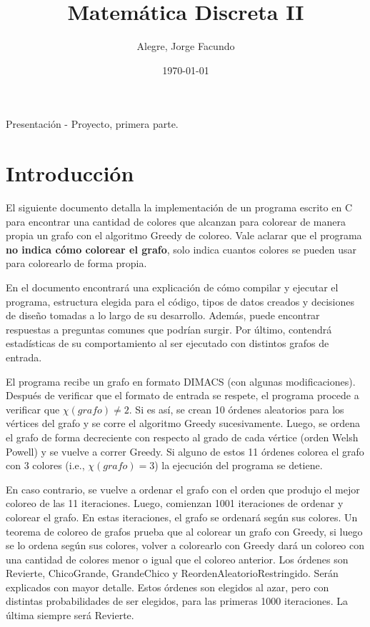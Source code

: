\documentclass[11pt]{article}   	%
\title{\vspace*{\fill}Matemática Discreta II}
\author{Alegre, Jorge Facundo}
\date{\today}
\begin{document}
\maketitle
\thispagestyle{empty}
\begin{center}
Presentación - Proyecto, primera parte.
\end{center}
\vspace*{\fill}
\clearpage

\tableofcontents
\clearpage

\section{Introducción}
El siguiente documento detalla la implementación de un programa escrito en C para encontrar una cantidad
de colores que alcanzan para colorear de manera propia un grafo con el algoritmo Greedy de coloreo.
Vale aclarar que el programa \textbf{no indica cómo colorear el grafo}, solo indica cuantos colores se
pueden usar para colorearlo de forma propia.

En el documento encontrará una explicación de cómo compilar y ejecutar el programa, 
estructura elegida para el código, tipos de datos creados y decisiones de diseño
tomadas a lo largo de su desarrollo.
Además, puede encontrar respuestas a preguntas comunes que podrían surgir.
Por último, contendrá estadísticas de su comportamiento al ser ejecutado con distintos grafos de entrada.

El programa recibe un grafo en formato DIMACS (con algunas modificaciones). Después
de verificar que el formato de entrada se respete, el programa procede a verificar que $\chi(grafo)\neq2$. Si
es así, se crean 10 órdenes aleatorios para los vértices del grafo y se corre el algoritmo Greedy
sucesivamente. Luego, se ordena el grafo de forma decreciente con respecto al grado de cada vértice (orden
Welsh Powell) y se vuelve a correr Greedy. Si alguno de estos 11 órdenes colorea
el grafo con 3 colores (i.e., $\chi(grafo)=3$) la ejecución del programa se detiene.

En caso contrario, se vuelve a ordenar el grafo con el orden que produjo el mejor coloreo de las 11
iteraciones. Luego, comienzan
1001 iteraciones de ordenar y colorear el grafo. En estas iteraciones, el grafo se ordenará según sus
colores. Un teorema de coloreo de grafos prueba que al colorear un grafo con Greedy, si luego se lo ordena
según sus colores, volver a colorearlo con Greedy dará un coloreo con una cantidad de colores menor o igual
que el coloreo anterior. Los órdenes son Revierte, ChicoGrande, GrandeChico y ReordenAleatorioRestringido.
Serán explicados con mayor detalle. Estos órdenes son elegidos al azar, pero con distintas probabilidades
de ser elegidos, para las primeras 1000 iteraciones. La última siempre será Revierte.
\end{document}
